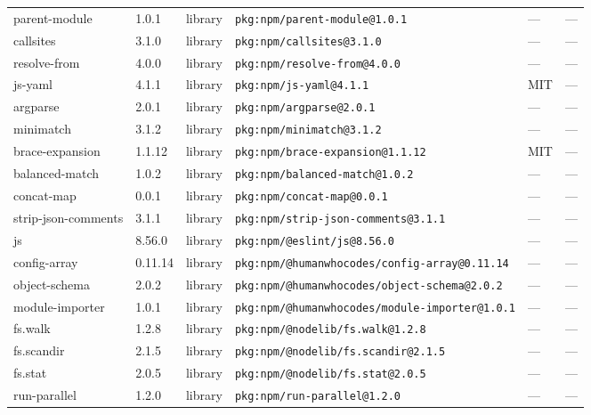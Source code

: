\documentclass[11pt,a4paper]{article}
\begin{document}
\begin{longtable}{|p{4cm}|p{2cm}|p{1.6cm}|p{5cm}|p{1.5cm}|p{3.5cm}|}
\raggedright parent-module & 1.0.1 & library & \small\texttt{pkg:npm/parent-module@1.0.1} & — & \small — \\
\raggedright callsites & 3.1.0 & library & \small\texttt{pkg:npm/callsites@3.1.0} & — & \small — \\
\raggedright resolve-from & 4.0.0 & library & \small\texttt{pkg:npm/resolve-from@4.0.0} & — & \small — \\
\raggedright js-yaml & 4.1.1 & library & \small\texttt{pkg:npm/js-yaml@4.1.1} & MIT & \small — \\
\raggedright argparse & 2.0.1 & library & \small\texttt{pkg:npm/argparse@2.0.1} & — & \small — \\
\raggedright minimatch & 3.1.2 & library & \small\texttt{pkg:npm/minimatch@3.1.2} & — & \small — \\
\raggedright brace-expansion & 1.1.12 & library & \small\texttt{pkg:npm/brace-expansion@1.1.12} & MIT & \small — \\
\raggedright balanced-match & 1.0.2 & library & \small\texttt{pkg:npm/balanced-match@1.0.2} & — & \small — \\
\raggedright concat-map & 0.0.1 & library & \small\texttt{pkg:npm/concat-map@0.0.1} & — & \small — \\
\raggedright strip-json-comments & 3.1.1 & library & \small\texttt{pkg:npm/strip-json-comments@3.1.1} & — & \small — \\
\raggedright js & 8.56.0 & library & \small\texttt{pkg:npm/@eslint/js@8.56.0} & — & \small — \\
\raggedright config-array & 0.11.14 & library & \small\texttt{pkg:npm/@humanwhocodes/config-array@0.11.14} & — & \small — \\
\raggedright object-schema & 2.0.2 & library & \small\texttt{pkg:npm/@humanwhocodes/object-schema@2.0.2} & — & \small — \\
\raggedright module-importer & 1.0.1 & library & \small\texttt{pkg:npm/@humanwhocodes/module-importer@1.0.1} & — & \small — \\
\raggedright fs.walk & 1.2.8 & library & \small\texttt{pkg:npm/@nodelib/fs.walk@1.2.8} & — & \small — \\
\raggedright fs.scandir & 2.1.5 & library & \small\texttt{pkg:npm/@nodelib/fs.scandir@2.1.5} & — & \small — \\
\raggedright fs.stat & 2.0.5 & library & \small\texttt{pkg:npm/@nodelib/fs.stat@2.0.5} & — & \small — \\
\raggedright run-parallel & 1.2.0 & library & \small\texttt{pkg:npm/run-parallel@1.2.0} & — & \small — \\

\end{longtable}
\end{document}
